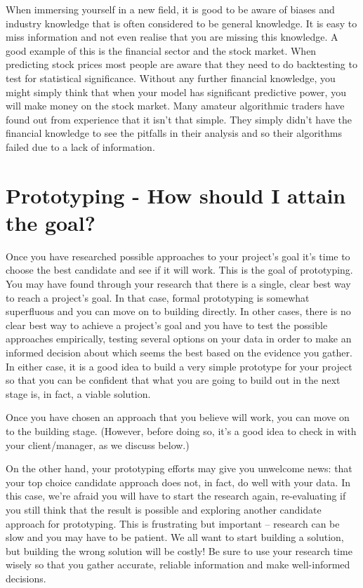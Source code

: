 \documentclass[
]{book}
\begin{document}
When immersing yourself in a new field, it is good to be aware of biases
and industry knowledge that is often considered to be general knowledge.
It is easy to miss information and not even realise that you are missing
this knowledge. A good example of this is the financial sector and the
stock market. When predicting stock prices most people are aware that
they need to do backtesting to test for statistical significance.
Without any further financial knowledge, you might simply think that
when your model has significant predictive power, you will make money on
the stock market. Many amateur algorithmic traders have found out from
experience that it isn't that simple. They simply didn't have the
financial knowledge to see the pitfalls in their analysis and so their
algorithms failed due to a lack of information.

\hypertarget{prototyping---how-should-i-attain-the-goal}{%
\section{Prototyping - How should I attain the
goal?}\label{prototyping---how-should-i-attain-the-goal}}

Once you have researched possible approaches to your project's goal it's
time to choose the best candidate and see if it will work. This is the
goal of prototyping. You may have found through your research that there
is a single, clear best way to reach a project's goal. In that case,
formal prototyping is somewhat superfluous and you can move on to
building directly. In other cases, there is no clear best way to achieve
a project's goal and you have to test the possible approaches
empirically, testing several options on your data in order to make an
informed decision about which seems the best based on the evidence you
gather. In either case, it is a good idea to build a very simple
prototype for your project so that you can be confident that what you
are going to build out in the next stage is, in fact, a viable solution.

Once you have chosen an approach that you believe will work, you can
move on to the building stage. (However, before doing so, it's a good
idea to check in with your client/manager, as we discuss below.)

On the other hand, your prototyping efforts may give you unwelcome news:
that your top choice candidate approach does not, in fact, do well with
your data. In this case, we're afraid you will have to start the
research again, re-evaluating if you still think that the result is
possible and exploring another candidate approach for prototyping. This
is frustrating but important -- research can be slow and you may have to
be patient. We all want to start building a solution, but building the
wrong solution will be costly! Be sure to use your research time wisely
so that you gather accurate, reliable information and make well-informed
decisions.
\end{document}

